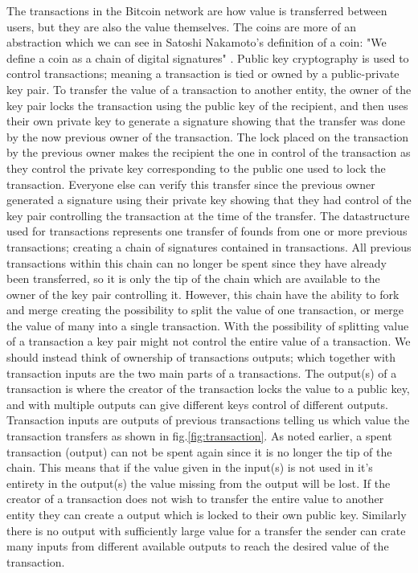 The transactions in the Bitcoin network are how value is transferred between users, but they are also the value themselves.
The coins are more of an abstraction which we can see in Satoshi Nakamoto's definition of a coin: "We define a coin as a chain of digital signatures" \cite{nakamoto2008bitcoin}.
Public key cryptography is used to control transactions; meaning a transaction is tied or owned by a public-private key pair.
To transfer the value of a transaction to another entity, the owner of the key pair locks the transaction using the public key of the recipient, and then uses their own private key to generate a signature showing that the transfer was done by the now previous owner of the transaction. The lock placed on the transaction by the previous owner makes the recipient the one in control of the transaction as they control the private key corresponding to the public one used to lock the transaction. Everyone else  can verify this transfer since the previous owner generated a signature using their private key showing that they had control of the key pair controlling the transaction at the time of the transfer. The datastructure used for transactions represents one transfer of founds from one or more previous transactions; creating a chain of signatures contained in transactions. All previous transactions within this chain can no longer be spent since they have already been transferred, so it is only the tip of the chain which are available to the owner of the key pair controlling it. However, this chain have the ability to fork and merge creating the possibility to split the value of one transaction, or merge the value of many into a single transaction. 
With the possibility of splitting value of a transaction a key pair might not control the entire value of a transaction. We should instead think of ownership of transactions outputs; which together with transaction inputs are the two main parts of a transactions. The output(s) of a transaction is where the creator of the transaction locks the value to a public key, and with multiple outputs can give different keys control of different outputs. Transaction inputs are outputs of previous transactions telling us which value the transaction transfers as shown in fig.\ref{fig:transaction}. As noted earlier, a spent transaction (output) can not be spent again since it is no longer the tip of the chain. This means that if the value given in the input(s) is not used in it's entirety in the output(s) the value missing from the output will be lost. If the creator of a transaction does not wish to transfer the entire value to another entity they can create a output which is locked to their own public key. Similarly there is no output with sufficiently large value for a transfer the sender can crate many inputs from different available outputs to reach the desired value of the transaction. 

